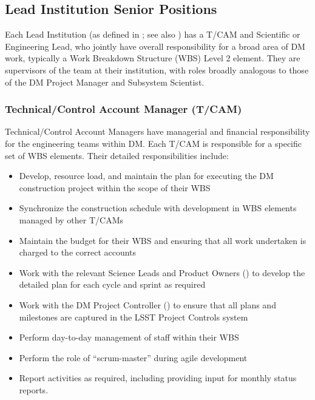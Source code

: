 \subsection{Lead Institution Senior Positions}

Each Lead Institution (as defined in ; see also ) has a \gls{T/CAM} and Scientific or Engineering Lead, who jointly have overall responsibility for a broad area of \gls{DM} work, typically a \gls{Work Breakdown Structure} (\gls{WBS}) Level 2 element. They are supervisors of the team at their institution, with roles broadly analogous to those of the \gls{DM} \gls{Project Manager} and \gls{Subsystem Scientist}.

\subsubsection{Technical/Control Account Manager (\gls{T/CAM}) \label{role:tcam}}

Technical/Control Account Managers have managerial and financial responsibility
for the engineering teams within \gls{DM}. Each \gls{T/CAM} is responsible for a specific set of \gls{WBS} elements. Their detailed responsibilities include:

\begin{itemize}

  \item{Develop, resource load, and maintain the plan for executing the \gls{DM} construction project within the scope of their WBS}
  \item{Synchronize the construction schedule with development in \gls{WBS} elements managed by other T/CAMs}
  \item{Maintain the budget for their \gls{WBS} and ensuring that all work undertaken is charged to the correct accounts}
  \item{Work with the relevant Science Leads and Product Owners () to develop the detailed plan for each cycle and sprint as required}
  \item{Work with the \gls{DM} Project Controller () to ensure that all plans and milestones are captured in the \gls{LSST} Project Controls system}
  \item{Perform day-to-day management of staff within their \gls{WBS}}
  \item{Perform the role of ``scrum-master'' during agile development}
  \item{Report activities as required, including providing input for monthly status reports.}

\end{itemize}


